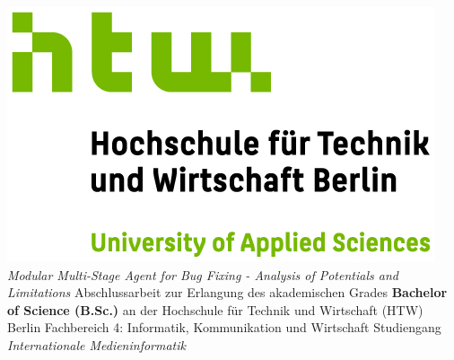 
\begin{titlepage}
    \begin{center}
        \includegraphics{images/HTW_Berlin_Logo_farbig.jpg}
        \linebreak[4]
        \linebreak[4]
        \linebreak[4]
        \linebreak[4]
        \textit{\large Modular Multi-Stage Agent for Bug Fixing - Analysis of Potentials and Limitations}
        \linebreak[4]
        \linebreak[4]
        \linebreak[4]
        Abschlussarbeit
        \linebreak[4]
        \linebreak[4]
        zur Erlangung des akademischen Grades
        \linebreak[4]
        \linebreak[4]
        \textbf{Bachelor of Science (B.Sc.)}
        \linebreak[4]
        \linebreak[4]
        an der
        \linebreak[4]
        \linebreak[4]
        Hochschule f\"ur Technik und Wirtschaft (HTW) Berlin
        \linebreak[4]
        Fachbereich 4: Informatik, Kommunikation und Wirtschaft
        \linebreak[4]
        Studiengang \textit{Internationale Medieninformatik}
        \linebreak[4]
        \linebreak[4]
        \linebreak[4]

\end{center}
\end{titlepage}
